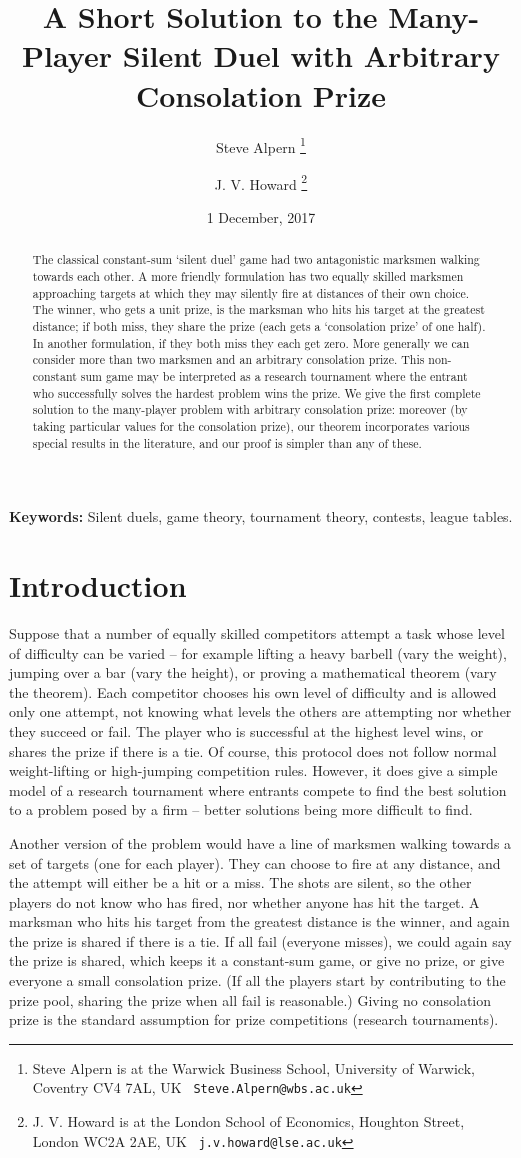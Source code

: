 \documentclass[11pt,a4paper]{article}%
\title{\textbf{
A Short Solution to the Many-Player Silent Duel with Arbitrary Consolation Prize
}}
\author{Steve Alpern%
\thanks{Steve Alpern is at the Warwick Business School,
University of Warwick, Coventry CV4 7AL, UK %
\texttt{ Steve.Alpern@wbs.ac.uk}}%
\and%
J. V. Howard%
\thanks{J. V. Howard is at the London School of Economics,
Houghton Street, London WC2A 2AE, UK %
\texttt{  j.v.howard@lse.ac.uk}}%
}%
\date{1 December, 2017}
\numberwithin{equation}{section}
\theoremstyle{plain}
\begin{document}
%
\maketitle%
\thispagestyle{empty}%
\pagestyle{plain}
%
%
\begin{abstract}
The classical constant-sum `silent duel' game had two antagonistic marksmen walking towards each other. A more friendly formulation has two equally skilled marksmen approaching targets at which they may silently fire at distances of their own choice. The winner, who gets a unit prize, is the marksman who hits his target at the greatest distance; if both miss, they share the prize (each gets a `consolation prize' of one half). In another formulation, if they both miss they each get zero. More generally we can consider more than two marksmen and an arbitrary consolation prize. This non-constant sum game may be interpreted as a research tournament where the entrant who successfully solves the hardest problem wins the prize. We give the first complete solution to the many-player problem with arbitrary consolation prize: moreover (by taking particular values for the consolation prize), our theorem incorporates various special results in the literature, and our proof is simpler than any of these.
\end{abstract}
%
\textbf{Keywords:} Silent duels, game theory, tournament theory, contests, league tables.
%
%
\newpage
%
\section{Introduction}
%
Suppose that a number of equally skilled competitors attempt a task whose level of difficulty can be varied -- for example lifting a heavy barbell (vary the weight), jumping over a bar (vary the height), or proving a mathematical theorem (vary the theorem). Each competitor chooses his own level of difficulty and is allowed only one attempt, not knowing what levels the others are attempting nor whether they succeed or fail. The player who is successful at the highest level wins, or shares the prize if there is a tie. Of course, this protocol does not follow normal weight-lifting or high-jumping competition rules. However, it does give a simple model of a research tournament where entrants compete to find the best solution to a problem posed by a firm -- better solutions being more difficult to find.

Another version of the problem would have a line of marksmen walking towards a set of targets (one for each player). They can choose to fire at any distance, and the attempt will either be a hit or a miss. The shots are silent, so the other players do not know who has fired, nor whether anyone has hit the target. A marksman who hits his target from the greatest distance is the winner, and again the prize is shared if there is a tie. If all fail (everyone misses), we could again say the prize is shared, which keeps it a constant-sum game, or give no prize, or give everyone a small consolation prize. (If all the players start by contributing to the prize pool, sharing the prize when all fail is reasonable.) Giving no consolation prize is the standard assumption for prize competitions (research tournaments).
\end{document}

